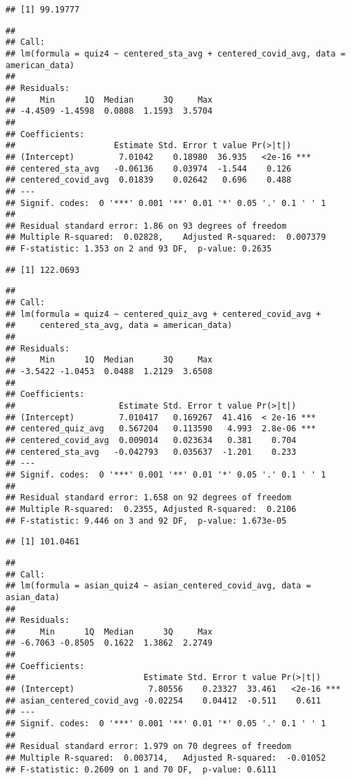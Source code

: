 \documentclass[
]{article}
\begin{document}
\begin{verbatim}
## [1] 99.19777
\end{verbatim}

\begin{verbatim}
## 
## Call:
## lm(formula = quiz4 ~ centered_sta_avg + centered_covid_avg, data = american_data)
## 
## Residuals:
##     Min      1Q  Median      3Q     Max 
## -4.4509 -1.4598  0.0808  1.1593  3.5704 
## 
## Coefficients:
##                    Estimate Std. Error t value Pr(>|t|)    
## (Intercept)         7.01042    0.18980  36.935   <2e-16 ***
## centered_sta_avg   -0.06136    0.03974  -1.544    0.126    
## centered_covid_avg  0.01839    0.02642   0.696    0.488    
## ---
## Signif. codes:  0 '***' 0.001 '**' 0.01 '*' 0.05 '.' 0.1 ' ' 1
## 
## Residual standard error: 1.86 on 93 degrees of freedom
## Multiple R-squared:  0.02828,    Adjusted R-squared:  0.007379 
## F-statistic: 1.353 on 2 and 93 DF,  p-value: 0.2635
\end{verbatim}

\begin{verbatim}
## [1] 122.0693
\end{verbatim}

\begin{verbatim}
## 
## Call:
## lm(formula = quiz4 ~ centered_quiz_avg + centered_covid_avg + 
##     centered_sta_avg, data = american_data)
## 
## Residuals:
##     Min      1Q  Median      3Q     Max 
## -3.5422 -1.0453  0.0488  1.2129  3.6508 
## 
## Coefficients:
##                     Estimate Std. Error t value Pr(>|t|)    
## (Intercept)         7.010417   0.169267  41.416  < 2e-16 ***
## centered_quiz_avg   0.567204   0.113590   4.993  2.8e-06 ***
## centered_covid_avg  0.009014   0.023634   0.381    0.704    
## centered_sta_avg   -0.042793   0.035637  -1.201    0.233    
## ---
## Signif. codes:  0 '***' 0.001 '**' 0.01 '*' 0.05 '.' 0.1 ' ' 1
## 
## Residual standard error: 1.658 on 92 degrees of freedom
## Multiple R-squared:  0.2355, Adjusted R-squared:  0.2106 
## F-statistic: 9.446 on 3 and 92 DF,  p-value: 1.673e-05
\end{verbatim}

\begin{verbatim}
## [1] 101.0461
\end{verbatim}

\begin{verbatim}
## 
## Call:
## lm(formula = asian_quiz4 ~ asian_centered_covid_avg, data = asian_data)
## 
## Residuals:
##     Min      1Q  Median      3Q     Max 
## -6.7063 -0.8505  0.1622  1.3862  2.2749 
## 
## Coefficients:
##                          Estimate Std. Error t value Pr(>|t|)    
## (Intercept)               7.80556    0.23327  33.461   <2e-16 ***
## asian_centered_covid_avg -0.02254    0.04412  -0.511    0.611    
## ---
## Signif. codes:  0 '***' 0.001 '**' 0.01 '*' 0.05 '.' 0.1 ' ' 1
## 
## Residual standard error: 1.979 on 70 degrees of freedom
## Multiple R-squared:  0.003714,   Adjusted R-squared:  -0.01052 
## F-statistic: 0.2609 on 1 and 70 DF,  p-value: 0.6111
\end{verbatim}
\end{document}

